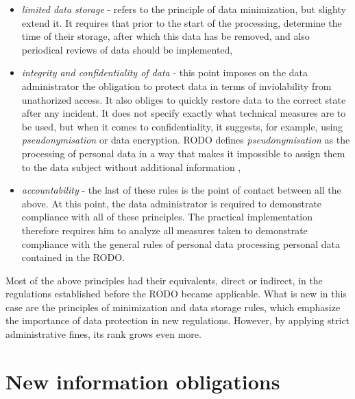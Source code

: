 \documentclass[en, noamssymb]{mgr}
\begin{document}
\begin{itemize}
\item \textit{limited data storage} - refers to the principle of data minimization, but slighty extend it. It requires that prior to the start of the processing, determine the time of their storage, after which this data has be removed, and also periodical reviews of data should be implemented,

\item \textit{integrity and confidentiality of data} - this point imposes on the data administrator the obligation to protect data in terms of inviolability from unathorized access. It also obliges to quickly restore data to the correct state after any incident. It does not specify exactly what technical measures are to be used, but when it comes to confidentiality, it suggests, for example, using \textit{pseudonymisation} or data encryption. RODO defines \textit{pseudonymisation} as the processing of personal data in a way that makes it impossible to assign them to the data subject without additional information \cite{rodo_art4},

\item \textit{accountability} - the last of these rules is the point of contact between all the above. At this point, the data administrator is required to demonstrate compliance with all of these principles. The practical implementation therefore requires him to analyze all measures taken to demonstrate compliance with the general rules of personal data processing personal data contained in the RODO.
\end{itemize}

Most of the above principles had their equivalents, direct or indirect, in the regulations established before the RODO became applicable. What is new in this case are the principles of minimization and data storage rules, which emphasize the importance of data protection in new regulations. However, by applying strict administrative fines, its rank grows even more.

\section{New information obligations}
\end{document}
